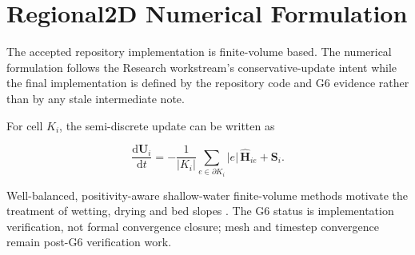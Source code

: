 \section{Regional2D Numerical Formulation}

The accepted repository implementation is finite-volume based. The numerical formulation follows the Research workstream's conservative-update intent while the final implementation is defined by the repository code and G6 evidence rather than by any stale intermediate note.

For cell \(K_i\), the semi-discrete update can be written as

\begin{equation}
\label{eq:finite-volume-update}
\frac{\mathrm d\mathbf U_i}{\mathrm dt}
=
-
\frac{1}{|K_i|}
\sum_{e\in\partial K_i}
|e|\,\widehat{\mathbf H}_{ie}
+
\mathbf S_i .
\end{equation}

Well-balanced, positivity-aware shallow-water finite-volume methods motivate the treatment of wetting, drying and bed slopes \autocite{kurganov2007wellbalanced,dutykh2011volna}. The G6 status is implementation verification, not formal convergence closure; mesh and timestep convergence remain post-G6 verification work.
